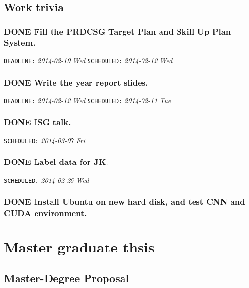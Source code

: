 \documentclass[CJK]{cctart}
\begin{document}
\subsection{Work trivia}
\label{sec-1-4}
\subsubsection{\textbf{DONE} Fill the PRDCSG Target Plan and Skill Up Plan System.}
\label{sec-1-4-1}
\label{9cc1900b-38f1-4170-9f4d-5d7fe7e1e7da}

    \texttt{DEADLINE:} \textit{2014-02-19 Wed} \texttt{SCHEDULED:} \textit{2014-02-12 Wed}
\subsubsection{\textbf{DONE} Write the year report slides.}
\label{sec-1-4-2}
\label{30b49261-ad0c-4573-af40-5b3d52844df0}

    \texttt{DEADLINE:} \textit{2014-02-12 Wed} \texttt{SCHEDULED:} \textit{2014-02-11 Tue}
\subsubsection{\textbf{DONE} ISG talk.}
\label{sec-1-4-3}
\label{b16d4f66-6ea8-46dc-b2bc-5e7f7652e49d}

    \texttt{SCHEDULED:} \textit{2014-03-07 Fri}
\subsubsection{\textbf{DONE} Label data for JK.}
\label{sec-1-4-4}
\label{1bbcfacc-6103-4979-893e-ada40e295d3b}

    \texttt{SCHEDULED:} \textit{2014-02-26 Wed}
\subsubsection{\textbf{DONE} Install Ubuntu on new hard disk, and test CNN and CUDA environment.}
\label{sec-1-4-5}
\label{d361d334-f20c-49d8-bf50-84f8ebd99bad}
\section{Master graduate thsis}
\label{sec-2}
\subsection{Master-Degree Proposal}
\label{sec-2-1}
\end{document}
